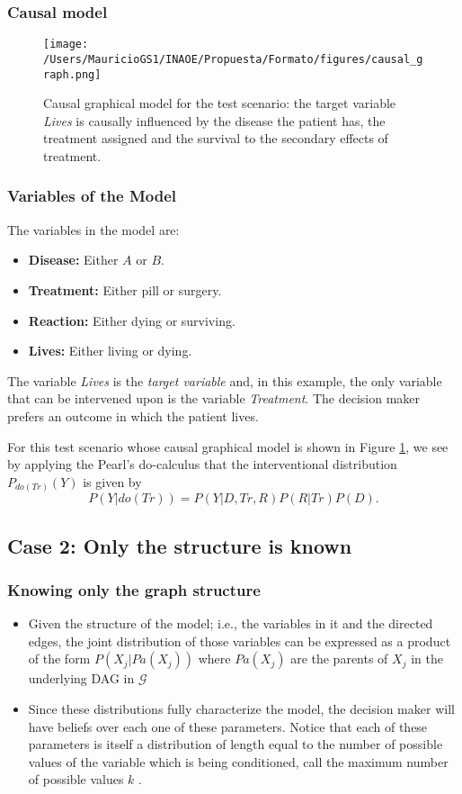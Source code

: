 \documentclass{beamer}
\theoremstyle{plain}
\begin{document}
\begin{frame}
\frametitle{Causal model}
\begin{figure}[ht]
\vskip 0.2in
\begin{center}
\centerline{\texttt{[image: /Users/MauricioGS1/INAOE/Propuesta/Formato/figures/causal\_graph.png]}}
\caption{Causal graphical model for the test scenario: the target variable \textit{Lives} is causally influenced by the disease the patient has, the treatment assigned and the survival to the secondary effects of treatment.}
\label{causal_model}
\end{center}
\vskip -0.2in
\end{figure}
\end{frame}

\begin{frame}
\frametitle{Variables of the Model}
The variables in the model are: 
\begin{itemize}
\item \textbf{Disease:} Either $A$ or $B$.
\item \textbf{Treatment:} Either pill or surgery.
\item \textbf{Reaction:} Either dying or surviving.
\item \textbf{Lives:} Either living or dying.
\end{itemize}
The variable \textit{Lives} is the \textit{target variable} and, in this example, the only variable that can be intervened upon is the variable \textit{Treatment}. The decision maker prefers an outcome in which the patient lives.
\end{frame}

\begin{frame}
For this test scenario whose causal graphical model is shown in Figure \ref{causal_model}, we see  by applying the Pearl's do-calculus that the interventional distribution $P_{do(Tr)}(Y)$ is given by
\[ P(Y | do(Tr))=P(Y | D, Tr, R)P(R | Tr) P(D). \]
\end{frame}

\subsection{Case 2: Only the structure is known}
\begin{frame}
\frametitle{Knowing only the graph structure}
\begin{itemize}
\item Given the structure of the model; i.e., the variables in it and the directed edges, the joint distribution of those variables can be expressed as a product of the form $P(X_j | Pa(X_j))$ where $Pa(X_j)$ are the parents of $X_j$ in the underlying DAG in $\mathcal{G}$
\item Since these distributions fully characterize the model, the decision maker will have beliefs over each one of these parameters. Notice that each of these parameters is itself a distribution of length equal to the number of possible values of the variable which is being conditioned, call the maximum number of possible values $k$ .
\end{itemize} 
\end{frame}
\end{document}

